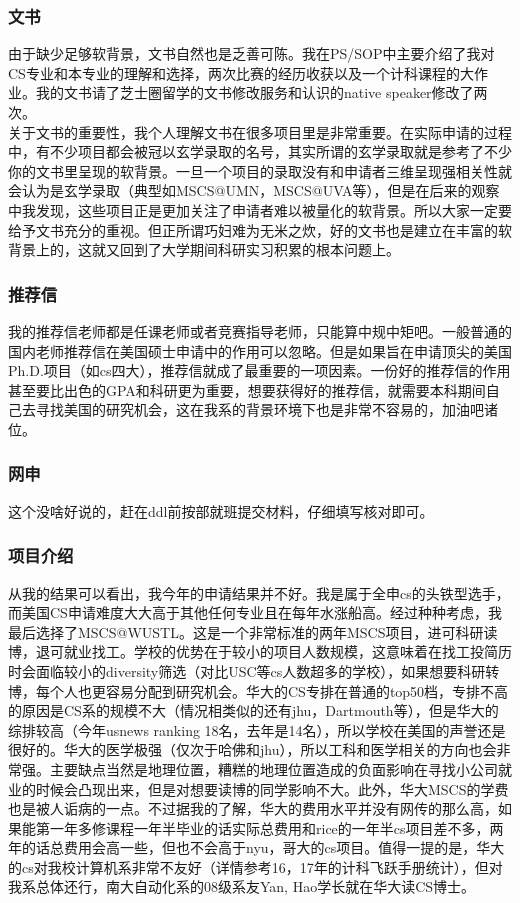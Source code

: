 \documentclass[a4paper,UTF8]{book}
\begin{document}
        \subsubsection*{文书}
        由于缺少足够软背景，文书自然也是乏善可陈。我在PS/SOP中主要介绍了我对CS专业和本专业的理解和选择，两次比赛的经历收获以及一个计科课程的大作业。我的文书请了芝士圈留学的文书修改服务和认识的native speaker修改了两次。\\
        关于文书的重要性，我个人理解文书在很多项目里是非常重要。在实际申请的过程中，有不少项目都会被冠以玄学录取的名号，其实所谓的玄学录取就是参考了不少你的文书里呈现的软背景。一旦一个项目的录取没有和申请者三维呈现强相关性就会认为是玄学录取（典型如MSCS@UMN，MSCS@UVA等），但是在后来的观察中我发现，这些项目正是更加关注了申请者难以被量化的软背景。所以大家一定要给予文书充分的重视。但正所谓巧妇难为无米之炊，好的文书也是建立在丰富的软背景上的，这就又回到了大学期间科研实习积累的根本问题上。

        \subsubsection*{推荐信}
        我的推荐信老师都是任课老师或者竞赛指导老师，只能算中规中矩吧。一般普通的国内老师推荐信在美国硕士申请中的作用可以忽略。但是如果旨在申请顶尖的美国Ph.D.项目（如cs四大），推荐信就成了最重要的一项因素。一份好的推荐信的作用甚至要比出色的GPA和科研更为重要，想要获得好的推荐信，就需要本科期间自己去寻找美国的研究机会，这在我系的背景环境下也是非常不容易的，加油吧诸位。

        \subsubsection*{网申}
        这个没啥好说的，赶在ddl前按部就班提交材料，仔细填写核对即可。

        \subsubsection*{项目介绍}
        从我的结果可以看出，我今年的申请结果并不好。我是属于全申cs的头铁型选手，而美国CS申请难度大大高于其他任何专业且在每年水涨船高。经过种种考虑，我最后选择了MSCS@WUSTL。这是一个非常标准的两年MSCS项目，进可科研读博，退可就业找工。学校的优势在于较小的项目人数规模，这意味着在找工投简历时会面临较小的diversity筛选（对比USC等cs人数超多的学校），如果想要科研转博，每个人也更容易分配到研究机会。华大的CS专排在普通的top50档，专排不高的原因是CS系的规模不大（情况相类似的还有jhu，Dartmouth等），但是华大的综排较高（今年usnews ranking 18名，去年是14名），所以学校在美国的声誉还是很好的。华大的医学极强（仅次于哈佛和jhu），所以工科和医学相关的方向也会非常强。主要缺点当然是地理位置，糟糕的地理位置造成的负面影响在寻找小公司就业的时候会凸现出来，但是对想要读博的同学影响不大。此外，华大MSCS的学费也是被人诟病的一点。不过据我的了解，华大的费用水平并没有网传的那么高，如果能第一年多修课程一年半毕业的话实际总费用和rice的一年半cs项目差不多，两年的话总费用会高一些，但也不会高于nyu，哥大的cs项目。值得一提的是，华大的cs对我校计算机系非常不友好（详情参考16，17年的计科飞跃手册统计），但对我系总体还行，南大自动化系的08级系友Yan, Hao学长就在华大读CS博士。
\end{document}
